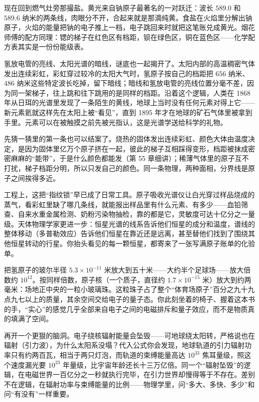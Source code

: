 \begin{mainline}
现在回到燃气灶旁那撮盐。黄光来自钠原子最著名的一对跃迁：波长 \(589.0\) 和 \(589.6\) 纳米的两条线，肉眼分不开，合起来就是那滴纯黄。食盐在火焰里分解出钠原子，火焰的能量把钠的电子推上一档，电子跳回来时就把这笔账兑成黄光。烟花师傅的配方同理：锶的梯子在红色区有档距，钡在绿色区，铜在蓝色区——化学配方表其实是一份份能级表。

氢放电管的亮线、太阳光谱的暗线，谜底也一起揭开了。太阳内部的高温稠密气体发出连续彩虹，彩虹穿过较冷的太阳大气时，氢原子按自己的档距把 \(656\) 纳米、\(486\) 纳米这些特定波长吃掉，留下暗线；暗线和氢放电管的亮线位置分毫不差，因为同一架梯子，往上跳和往下跳用的是同样的档距。沿着这个逻辑，人类在 1868 年从日珥的光谱里发现了一条陌生的黄线，地球上当时没有任何元素对得上它——新元素氦就这样先在太阳上被“看见”，直到 1895 年才在地球的矿石气体里被拿到手里。元素可以在被触摸之前先被光指认，这是光谱学送给科学的礼物。

先猜一猜里的第一条也可以结案了。烧热的固体发出连续彩虹、颜色大体由温度决定，是因为固体里亿万个原子挤在一起，彼此的梯子互相踩得变形，档距被抹成密密麻麻的“能带”，于是什么颜色都能发（第 55 章细讲）；稀薄气体里的原子互不打扰，梯子档距分明，所以只发自己的颜色。同一条物理，两种面相，分界线是原子之间挨得多近。

工程上，这把“指纹锁”早已成了日常工具。原子吸收光谱仪让白光穿过样品烧成的蒸气，看彩虹里缺了哪几条线，就能报出样品里有什么元素、有多少——血铅筛查、自来水重金属检测、奶粉污染物抽检，靠的都是它，灵敏度可达十亿分之一量级。天体物理学家更进一步：恒星光谱的线系告诉他们恒星的成分和温度，谱线的整体移动（多普勒效应）告诉他们恒星在靠近还是远离，甚至替他们找到了围绕其他恒星转动的行星。你抬头看见的每一颗恒星，都寄来了一张写满原子账单的化验单。
\end{mainline}


\begin{thought}[把原子放大到一座体育场]
把氢原子的玻尔半径 \(5.3\times10^{-11}\) 米放大到五十米——大约半个足球场——放大倍数约 \(10^{12}\)。按同样倍数，原子核（一个质子，直径约 \(1.7\times10^{-15}\) 米）放大到约两毫米：场地正中央的一粒小玻璃珠。这粒珠子占了整个“体育场原子”百分之九十九点九七以上的质量，其余空间交给电子的量子态。你此刻坐着的椅子、握着这本书的手，“实心”的感觉几乎全部来自电子之间的电磁排斥和量子效应，而不是物质真的填满了空间。

再开一个更狠的脑洞。电子绕核辐射能量会坠毁——可地球绕太阳转，严格说也在辐射（引力波），为什么太阳系没塌？代入公式你会发现，地球轨道的引力辐射功率只有约两百瓦，相当于两只灯泡，而轨道的束缚能量高达 \(10^{33}\) 焦耳量级，照这个速度漏光要 \(10^{23}\) 年量级，比宇宙年龄还长十三万亿倍。同一个“辐射坠毁”的逻辑，在电磁世界一百亿分之一秒就执行完毕，在引力世界却慢得等于不存在。差别不在逻辑，在辐射功率与束缚能量的比例——物理学里，问“多大、多快、多少”和问“有没有”一样重要。
\end{thought}

